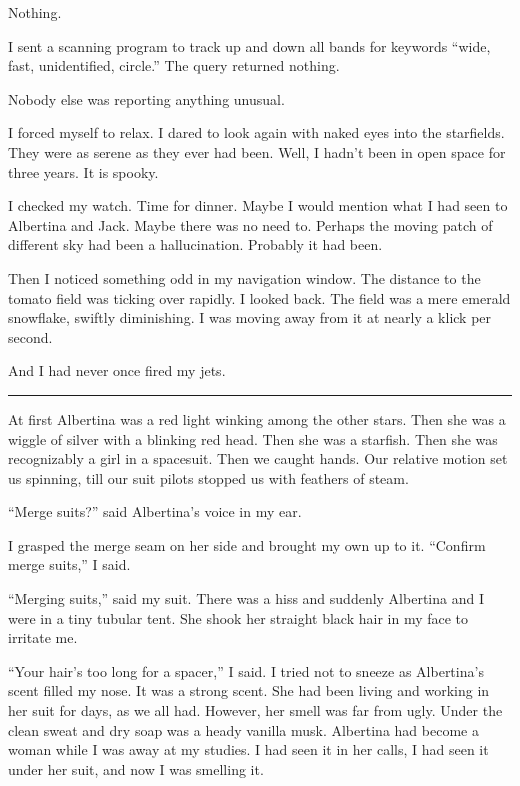 \documentclass[english,11pt,letterpaper,onecolumn]{scrbook}
\begin{document}
	Nothing.  

	I sent a scanning program to track up and down all bands for keywords ``wide, fast, unidentified, circle.''  The query returned nothing.  

	Nobody else was reporting anything unusual.

	I forced myself to relax.  I dared to look again with naked eyes into the starfields.  They were as serene as they ever had been.  Well, I hadn't been in open space for three years.  It is spooky.

	I checked my watch.  Time for dinner.  Maybe I would mention what I had seen to Albertina and Jack.  Maybe there was no need to. 
 Perhaps the moving patch of different sky had been a hallucination.  Probably it had been.

	Then I noticed something odd in my navigation window.  The distance to the tomato field was ticking over rapidly.  I looked back.  The field was a mere emerald snowflake, swiftly diminishing.  I was moving away from it at nearly a klick per second.  

	And I had never once fired my jets.

\begin{center}\rule[3pt]{2in}{0.5pt}\end{center}

	At first Albertina was a red light winking among the other stars.  Then she was a wiggle of silver with a blinking red head.  Then she was a starfish.  Then she was recognizably a girl in a spacesuit.  Then we caught hands.  Our relative motion set us spinning, till our suit pilots stopped us with feathers of steam.

	``Merge suits?'' said Albertina's voice in my ear.

	I grasped the merge seam on her side and brought my own up to it.  ``Confirm merge suits,'' I said.  

	``Merging suits,'' said my suit.  There was a hiss and suddenly Albertina and I were in a tiny tubular tent.  She shook her straight black hair in my face to irritate me.

	``Your hair's too long for a spacer,'' I said.  I tried not to sneeze as Albertina's scent filled my nose.  It was a strong scent.  She had been living and working in her suit for days, as we all had.  However, her smell was far from ugly.  Under the clean sweat and dry soap was a heady vanilla musk.  Albertina had become a woman while I was away at my studies.  I had seen it in her calls, I had seen it under her suit, and now I was smelling it.
\end{document}
